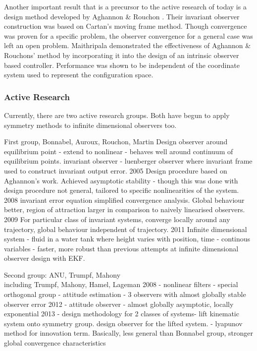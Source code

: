 Another important result that is a precursor to the active research of today is a design method developed by Aghannon \& Rouchon \cite{aghannan2002invariant}. Their invariant observer construction was based on Cartan's moving frame method. Though convergence was proven for a specific problem, the observer convergence for a general case was left an open problem. Maithripala \cite{maithripala2005intrinsic} demonstrated the effectiveness of Aghannon \& Rouchons' method by incorporating it into the design of an intrinsic observer based controller. Performance was shown to be independent of the coordinate system used to represent the configuration space.

\subsubsection{Active Research}
Currently, there are two active research groups. Both have begun to apply symmetry methods to infinite dimensional observers too.

First group, Bonnabel, Auroux, Rouchon, Martin
Design observer around equilibrium point - extend to nonlinear - behaves well around continuum of equilibrium points. 
invariant observer - luenberger observer where invariant frame used to construct invariant output error.
2005 \cite{bonnabel2005invariant} Design procedure based on Aghannon's work. Achieved asymptotic stability - though this was done with design procedure not general, tailored to specific nonlinearities of the system.
2008 \cite{bonnabel2008symmetry} invariant error equation simplified convergence analysis. Global behaviour better, region of attraction larger in comparison to naively linearised observers.
2009 \cite{bonnabel2009non} For particular class of invariant systems, converge locally around any trajectory, global behaviour independent of trajectory.
2011 \cite{auroux2011symmetry} Infinite dimensional system - fluid in a water tank where height varies with position, time - continous variables - faster, more robust than previous attempts at infinite dimensional observer design with EKF.

Second group: ANU, Trumpf, Mahony\\
including Trumpf, Mahony, Hamel, Lageman
2008 \cite{mahony2009nonlinear} - nonlinear filters - special orthogonal group - attitude estimation - 3 observers with almost globally stable observer error
2012 \cite{trumpf2012analysis} - attitude observer - almost globally asymptotic, locally exponential
2013 \cite{mahony2013observers} - design methodology for 2 classes of systems- lift kinematic system onto symmetry group. design observer for the lifted system. - lyapunov method for innovation term. Basically, less general than Bonnabel group, stronger global convergence characteristics

